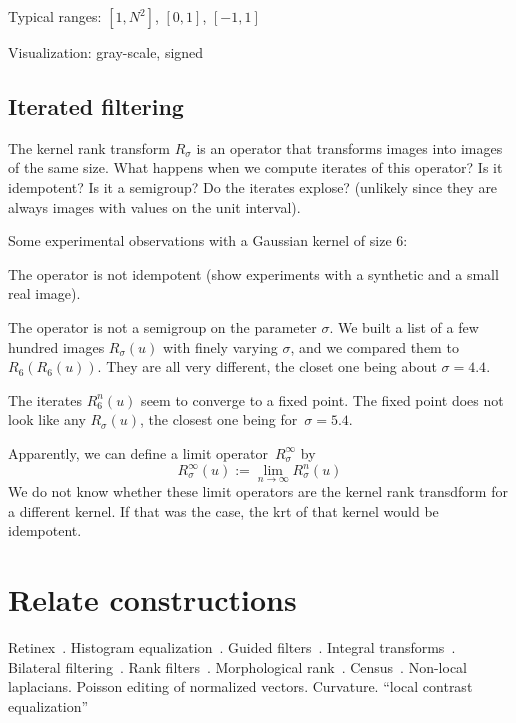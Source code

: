 \documentclass[12pt]{article}                  %
\begin{document}
Typical ranges: $[1,N^2]$, $[0,1]$, $[-1,1]$

Visualization: gray-scale, signed



\subsection{Iterated filtering}

The kernel rank transform $R_\sigma$ is an operator that transforms images into images of the same size.
What happens when we compute iterates of this operator?   Is it idempotent?  Is it a semigroup?  Do the iterates explose? (unlikely since they are always images with values on the unit interval).

Some experimental observations with a Gaussian kernel of size
6:

The operator is not idempotent (show experiments with a synthetic and a small real image).

The operator is not a semigroup on the parameter $\sigma$.  We built a list of a few hundred images $R_\sigma(u)$ with finely varying $\sigma$, and we compared them to $R_6(R_6(u))$.  They are all very different, the closet one being about $\sigma=4.4$.

The iterates $R_6^n(u)$ seem to converge to a fixed point.  The fixed point does not look like any $R_\sigma(u)$, the closest one being for~$\sigma=5.4$.

Apparently, we can define a limit operator~$R^\infty_\sigma$ by
\[
R^\infty_\sigma(u) := \lim_{n\to\infty}R^n_\sigma(u)
\]
We do not know whether these limit operators are the kernel rank transdform for a different kernel.   If that was the case, the krt of that kernel  would be idempotent.   

\section{Relate constructions}

Retinex~\cite{land1971lightness,land1977retinex,land1985recent,kimmel2003variational,provenzi2005mathematical,morel2010pde,petro2014multiscale}.
Histogram equalization~\cite{pizer1987adaptive,abdullah2007dynamic}.
Guided filters~\cite{he2012guided}.
Integral transforms~\cite{bradley2007adaptive}.
Bilateral filtering~\cite{tomasi1998bilateral,durand2002fast,paris2009bilateral}.
Rank filters~\cite{rankfilters1985}.
Morphological rank~\cite{soille2002morphological}.
Census~\cite{ZW,stein2004efficient,whycensus2013}.
Non-local laplacians.
Poisson editing of normalized vectors.
Curvature.
``local contrast equalization''~\cite{sapiro1997histogram}
\end{document}

